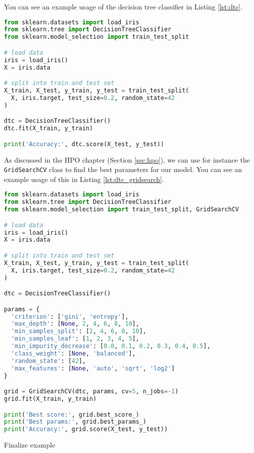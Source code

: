 You can see an example usage of the decision tree classifier in Listing \ref{lst:dtc}.
\begin{lstlisting}[language=Python, caption={Example usage of the decision tree classifier.}, label={lst:dtc}]
from sklearn.datasets import load_iris
from sklearn.tree import DecisionTreeClassifier
from sklearn.model_selection import train_test_split

# load data
iris = load_iris()
X = iris.data

# split into train and test set
X_train, X_test, y_train, y_test = train_test_split(
  X, iris.target, test_size=0.2, random_state=42
)

dtc = DecisionTreeClassifier()
dtc.fit(X_train, y_train)

print('Accuracy:', dtc.score(X_test, y_test))
\end{lstlisting}
As discussed in the HPO chapter (Section \ref{sec:hpo}), we can use for instance the \texttt{GridSearchCV} class to find the best parameters for our model.
You can see an example usage of this in Listing \ref{lst:dtc_gridsearch}.
\begin{lstlisting}[language=Python, caption={Example usage of the decision tree classifier with grid search.}, label={lst:dtc_gridsearch}]
from sklearn.datasets import load_iris
from sklearn.tree import DecisionTreeClassifier
from sklearn.model_selection import train_test_split, GridSearchCV

# load data
iris = load_iris()
X = iris.data

# split into train and test set
X_train, X_test, y_train, y_test = train_test_split(
  X, iris.target, test_size=0.2, random_state=42
)

dtc = DecisionTreeClassifier()

params = {
  'criterion': ['gini', 'entropy'],
  'max_depth': [None, 2, 4, 6, 8, 10],
  'min_samples_split': [2, 4, 6, 8, 10],
  'min_samples_leaf': [1, 2, 3, 4, 5],
  'min_impurity_decrease': [0.0, 0.1, 0.2, 0.3, 0.4, 0.5],
  'class_weight': [None, 'balanced'],
  'random_state': [42],
  'max_features': [None, 'auto', 'sqrt', 'log2']
}

grid = GridSearchCV(dtc, params, cv=5, n_jobs=-1)
grid.fit(X_train, y_train)

print('Best score:', grid.best_score_)
print('Best params:', grid.best_params_)
print('Accuracy:', grid.score(X_test, y_test))
\end{lstlisting}



\framedtext{\color{red}{TODO:}} Finalize example

